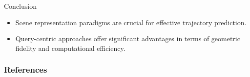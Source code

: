 \documentclass[10pt,aspectratio=169]{beamer}
\begin{document}
\begin{frame}{Conclusion}
\begin{itemize}
    \item Scene representation paradigms are crucial for effective trajectory prediction.
    \item Query-centric approaches offer significant advantages in terms of geometric fidelity and computational efficiency.
\end{itemize}
\end{frame}

\begin{frame}[allowframebreaks]
  \frametitle{References}
  
  
\end{frame}
\end{document}

